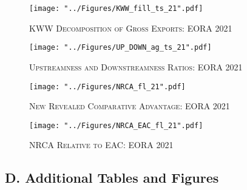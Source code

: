 \documentclass[a4paper]{article}
\begin{document}
\begin{figure}[h!]
\centering
\caption{\label{fig:KWW_fill_ts_21}\textsc{KWW Decomposition of Gross Exports: EORA 2021}}
\texttt{[image: "../Figures/KWW\_fill\_ts\_21".pdf]} %
\end{figure}
\FloatBarrier
 

\begin{figure}[h!] %
\centering
\caption{\label{fig:UP_DOWN_ag_ts_21}\textsc{Upstreamness and Downstreamness Ratios: EORA 2021}}
\texttt{[image: "../Figures/UP\_DOWN\_ag\_ts\_21".pdf]} %
\vspace{-1cm}
\end{figure} 
\FloatBarrier 

\begin{figure}[h!]
\centering
\caption{\label{fig:NRCA_21}\textsc{New Revealed Comparative Advantage: EORA 2021}}
\texttt{[image: "../Figures/NRCA\_fl\_21".pdf]} %
\end{figure}
\FloatBarrier

\begin{figure}[h!]
\centering
\caption{\label{fig:NRCA_EAC_21}\textsc{NRCA Relative to EAC: EORA 2021}}
\texttt{[image: "../Figures/NRCA\_EAC\_fl\_21".pdf]} %
\vspace{-1cm}
\end{figure}
\FloatBarrier

\newpage

\subsection*{D. Additional Tables and Figures}
\setcounter{table}{0}
\renewcommand{\thetable}{D\arabic{table}}
\setcounter{figure}{0}
\renewcommand{\thefigure}{D\arabic{figure}}

\end{document}
